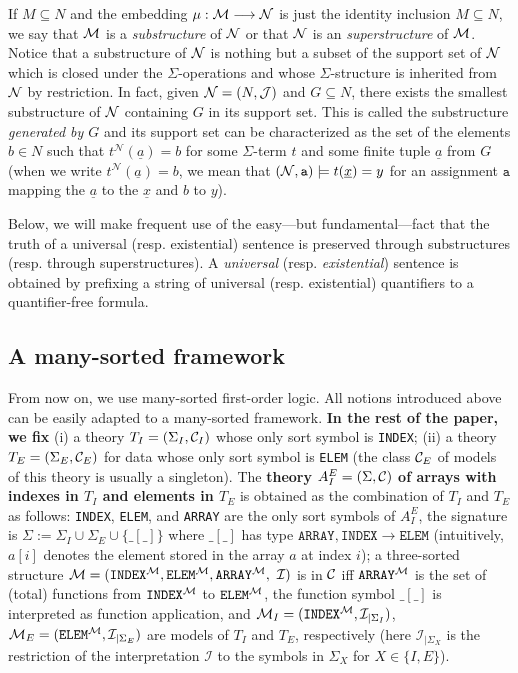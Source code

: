 \documentclass{LMCS}
\newcommand{\ua}{\ensuremath{\underline a}}
\newcommand{\ux}{\ensuremath{\underline x}}
\newcommand{\cM}{\ensuremath \mathcal M}
\newcommand{\cN}{\ensuremath \mathcal N}
\newcommand{\Cc}{\ensuremath \mathcal C}
\newcommand{\lra}{\longrightarrow}
\renewcommand{\int}{\ensuremath {\mathcal I}}
\theoremstyle{plain}\newtheorem{assumption}[thm]{Assumption}
\theoremstyle{plain}\newtheorem{proposition}[thm]{Proposition}
\theoremstyle{plain}\newtheorem{property}[thm]{Property}
\theoremstyle{plain}\newtheorem{example}[thm]{Example}
\theoremstyle{plain}\newtheorem{claim}[thm]{Claim}
\theoremstyle{plain}\newtheorem{lemma}[thm]{Lemma}
\begin{document}
If $M\subseteq N$ and the embedding $\mu: \cM \lra \cN$ is just the
identity inclusion $M\subseteq N$, we say that $\cM$ is a {\it
  substructure} of $\cN$ or that $\cN$ is an {\it superstructure} of
$\cM$. Notice that a substructure of $\cN$ is nothing but a subset of
the support set of $\cN$ which is closed under the $\Sigma$-operations
and whose $\Sigma$-structure is inherited from $\cN$ by
restriction. In fact, given $\cN=(N, \mathcal J)$ and $G\subseteq N$,
there exists the smallest substructure of $\cN$ containing $G$ in its
support set. This is called the substructure \emph{generated by $G$}
and its support set can be characterized as the set of the elements
$b\in N$ such that $t^{\mathcal N}(\ua)=b$ for some $\Sigma$-term $t$
and some finite tuple $\ua$ from $G$ (when we write $t^{\mathcal
  N}(\ua)=b$, we mean that $(\cN, \mathtt{a}) \models t(\ux)=y$ for an
assignment $\mathtt{a}$ mapping the $\ua$ to the $\ux$ and $b$ to
$y$).

Below, we will make frequent use of the easy---but fundamental---fact
that the truth of a universal (resp. existential) sentence is
preserved through substructures (resp. through superstructures).  A
\emph{universal} (resp. \emph{existential}) sentence is obtained by
prefixing a string of universal (resp. existential) quantifiers to a
quantifier-free formula.

\subsection{A many-sorted framework}
\label{subsec:many-sort}
From now on, we use many-sorted first-order logic.  All notions
introduced above can be easily adapted to a many-sorted framework.
\textbf{In the rest of the paper, we fix} (i) a theory $T_I=(\Sigma_I,
\Cc_I)$ whose only sort symbol is \texttt{INDEX}; (ii) a
theory $T_E=(\Sigma_E, \Cc_E)$ for data whose only sort symbol is
\texttt{ELEM} (the class $\Cc_E$ of models of this theory is usually a
singleton).
The \textbf{theory $A_I^E=(\Sigma, \Cc)$ of arrays with indexes in $T_I$
  and elements in $T_E$} is obtained as the combination of $T_I$ and $T_E$
as follows: \texttt{INDEX}, \texttt{ELEM}, and \texttt{ARRAY} are the
only sort symbols of $A_I^E$, the signature is $\Sigma := \Sigma_I\cup
\Sigma_E\cup \{ \_[\_] \}$ where $\_[\_]$ has type $\mathtt{ARRAY},
\mathtt{INDEX} \longrightarrow \mathtt{ELEM}$ (intuitively, $a[i]$
denotes the element stored in the array $a$ at index $i$); a
three-sorted structure $\cM = ({\tt INDEX}^{\cM}, {\tt ELEM}^{\cM},
{\tt ARRAY}^{\cM}, ~\int)$ is in $\Cc$ iff ${\tt ARRAY}^{\cM}$ is the
set of (total) functions from ${\tt INDEX}^{\cM}$ to ${\tt
  ELEM}^{\cM}$, the function symbol $\_[\_]$ is interpreted as
function application, and $\cM_I=(\mathtt{INDEX}^{\cM},\int_{\vert
  \Sigma_I})$, $\cM_E=(\mathtt{ELEM}^{\cM},\int_{\vert \Sigma_E})$ are
models of $T_I$ and $T_E$, respectively (here $\int_{\vert \Sigma_X}$
is the restriction of the interpretation $\int$ to the symbols in
$\Sigma_X$ for $X\in\{I,E\}$).
\end{document}

